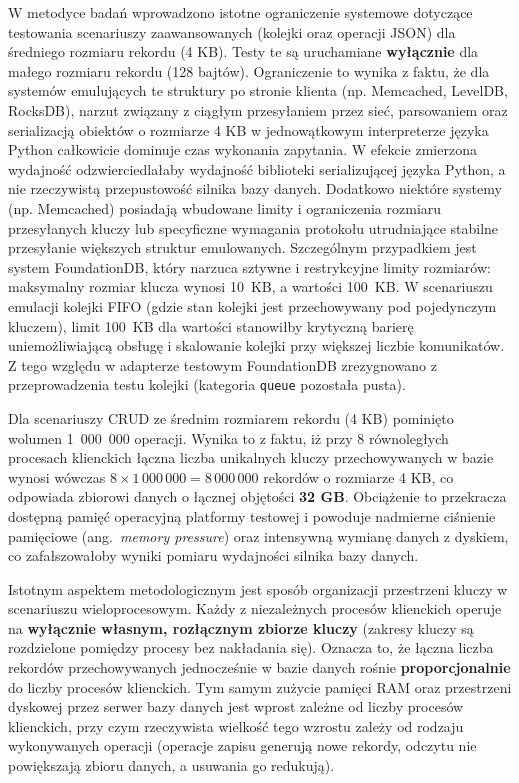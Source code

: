 W metodyce badań wprowadzono istotne ograniczenie systemowe dotyczące testowania scenariuszy zaawansowanych (kolejki oraz operacji JSON) dla średniego rozmiaru rekordu (4 KB). Testy te są uruchamiane \textbf{wyłącznie} dla małego rozmiaru rekordu (128 bajtów). Ograniczenie to wynika z faktu, że dla systemów emulujących te struktury po stronie klienta (np. Memcached, LevelDB, RocksDB), narzut związany z ciągłym przesyłaniem przez sieć, parsowaniem oraz serializacją obiektów o rozmiarze 4 KB w jednowątkowym interpreterze języka Python całkowicie dominuje czas wykonania zapytania. W efekcie zmierzona wydajność odzwierciedlałaby wydajność biblioteki serializującej języka Python, a nie rzeczywistą przepustowość silnika bazy danych. Dodatkowo niektóre systemy (np. Memcached) posiadają wbudowane limity i ograniczenia rozmiaru przesyłanych kluczy lub specyficzne wymagania protokołu utrudniające stabilne przesyłanie większych struktur emulowanych. Szczególnym przypadkiem jest system FoundationDB, który narzuca sztywne i restrykcyjne limity rozmiarów: maksymalny rozmiar klucza wynosi 10~KB, a wartości 100~KB. W scenariuszu emulacji kolejki FIFO (gdzie stan kolejki jest przechowywany pod pojedynczym kluczem), limit 100~KB dla wartości stanowiłby krytyczną barierę uniemożliwiającą obsługę i skalowanie kolejki przy większej liczbie komunikatów. Z tego względu w adapterze testowym FoundationDB zrezygnowano z przeprowadzenia testu kolejki (kategoria \texttt{queue} pozostała pusta).

Dla scenariuszy CRUD ze średnim rozmiarem rekordu (4 KB) pominięto wolumen 1~000~000 operacji. Wynika to z faktu, iż przy 8 równoległych procesach klienckich łączna liczba unikalnych kluczy przechowywanych w bazie wynosi wówczas $8 \times 1\,000\,000 = 8\,000\,000$ rekordów o rozmiarze 4 KB, co odpowiada zbiorowi danych o łącznej objętości \textbf{32 GB}. Obciążenie to przekracza dostępną pamięć operacyjną platformy testowej i powoduje nadmierne ciśnienie pamięciowe (ang.~\emph{memory pressure}) oraz intensywną wymianę danych z dyskiem, co zafałszowałoby wyniki pomiaru wydajności silnika bazy danych.

Istotnym aspektem metodologicznym jest sposób organizacji przestrzeni kluczy w scenariuszu wieloprocesowym. Każdy z niezależnych procesów klienckich operuje na \textbf{wyłącznie własnym, rozłącznym zbiorze kluczy} (zakresy kluczy są rozdzielone pomiędzy procesy bez nakładania się). Oznacza to, że łączna liczba rekordów przechowywanych jednocześnie w bazie danych rośnie \textbf{proporcjonalnie} do liczby procesów klienckich. Tym samym zużycie pamięci RAM oraz przestrzeni dyskowej przez serwer bazy danych jest wprost zależne od liczby procesów klienckich, przy czym rzeczywista wielkość tego wzrostu zależy od rodzaju wykonywanych operacji (operacje zapisu generują nowe rekordy, odczytu nie powiększają zbioru danych, a usuwania go redukują).



